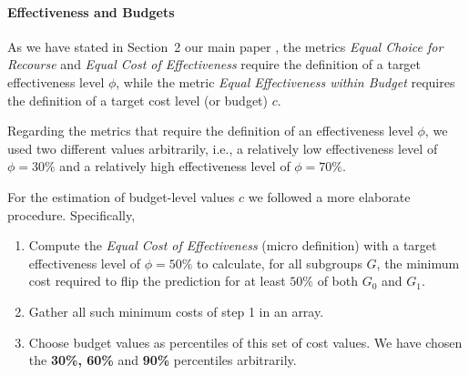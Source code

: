 \documentclass{article}
\begin{document}









\paragraph{Effectiveness and Budgets}
As we have stated in Section~2 our main paper , the metrics \textit{Equal Choice for Recourse} and \textit{Equal Cost of Effectiveness} require the definition of a target effectiveness level $\phi$, while the metric \textit{Equal Effectiveness within Budget} requires the definition of a target cost level (or budget) $c$.

Regarding the metrics that require  the definition of an effectiveness level $\phi$, we used two different values arbitrarily, i.e., a relatively low effectiveness level of $\phi = 30\%$ and a relatively high effectiveness level of $\phi = 70\%$.

For the estimation of budget-level values $c$
we followed a more elaborate procedure. Specifically, 
\begin{enumerate}
    \item Compute the \textit{Equal Cost of Effectiveness} (micro definition) with a target effectiveness level of $\phi = 50\%$ to calculate, for all subgroups $G$, the minimum cost required to flip the prediction for at least $50\%$ of both $G_0$ and $G_1$.
    \item Gather all such minimum costs of step 1 in an array.
    \item Choose budget values as percentiles of this set of cost values. We have chosen the \textbf{30\%, 60\%} and \textbf{90\%} percentiles arbitrarily.
\end{enumerate}
\end{document}
